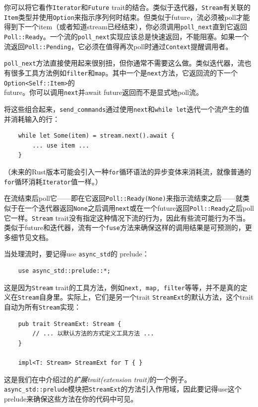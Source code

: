 你可以将它看作\texttt{Iterator}和\texttt{Future} trait的结合。类似于迭代器，\texttt{Stream}有关联的\texttt{Item}类型并使用\texttt{Option}来指示序列何时结束。但类似于future，流必须被poll才能得到下一个item（或者知道stream已经结束），你必须调用\texttt{poll\_next}直到它返回\texttt{Poll::Ready}。一个流的\texttt{poll\_next}实现应该总是快速返回，不能阻塞。如果一个流返回\texttt{Poll::Pending}，它必须在值得再次poll时通过\texttt{Context}提醒调用者。

\texttt{poll\_next}方法直接使用起来很别扭，但你通常不需要这么做。类似迭代器，流也有很多工具方法例如\texttt{filter}和\texttt{map}。其中一个是\texttt{next}方法，它返回流的下一个\texttt{Option<Self::Item>}的\\
future。你可以调用\texttt{next}并await future返回而不是显式地poll流。

将这些组合起来，\texttt{send\_commands}通过使用\texttt{next}和\texttt{while let}迭代一个流产生的值并消耗输入的行：
\begin{verbatim}
    while let Some(item) = stream.next().await {
        ... use item ...
    }
\end{verbatim}

（未来的Rust版本可能会引入一种\texttt{for}循环语法的异步变体来消耗流，就像普通的\texttt{for}循环消耗\texttt{Iterator}值一样。）

在流结束后poll它——即在它返回\texttt{Poll::Ready(None)}来指示流结束之后——就类似于在一个迭代器返回\texttt{None}之后调用\texttt{next}或在一个future返回\texttt{Poll::Ready}之后poll它一样。\texttt{Stream} trait没有指定这种情况下流的行为，因此有些流可能行为不当。类似于future和迭代器，流有一个\texttt{fuse}方法来确保这样的调用结果是可预测的，更多细节见文档。

当处理流时，要记得use \texttt{async\_std}的 prelude：
\begin{verbatim}
    use async_std::prelude::*;
\end{verbatim}

这是因为\texttt{Stream} trait的工具方法，例如\texttt{next, map, filter}等等，并不是真的定义在\texttt{Stream}自身里。实际上，它们是另一个trait \texttt{StreamExt}的默认方法，这个trait自动为所有\texttt{Stream}实现：
\begin{verbatim}
    pub trait StreamExt: Stream {
        // ... 以默认方法的方式定义工具方法 ...
    }

    impl<T: Stream> StreamExt for T { }
\end{verbatim}

这是我们在中介绍过的\emph{扩展trait(extension trait)}的一个例子。\\
\texttt{async\_std::prelude}模块把\texttt{StreamExt}的方法引入作用域，因此要记得use这个prelude来确保这些方法在你的代码中可见。

